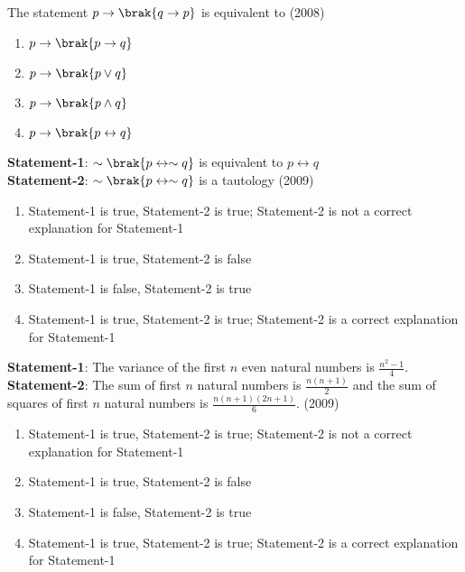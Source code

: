     \item The statement $p \to \brak{q \to p}$ is equivalent to
        \hfill (2008)

        \begin{multicols}{2}
            \begin{enumerate}
                \item $p \to \brak{p \to q}$
                \item $p \to \brak{p \lor q}$
                \item $p \to \brak{p \land q}$
                \item $p \to \brak{p \leftrightarrow q}$
            \end{enumerate}
        \end{multicols}
        
    \item \textbf{Statement-1}: $\sim \brak{p \leftrightarrow \sim q}$ is
        equivalent to $p \leftrightarrow q$ \\
        \textbf{Statement-2}: $\sim \brak{p \leftrightarrow \sim q}$
        is a tautology
        \hfill (2009)
        
        \begin{enumerate}
            \item Statement-1 is true, Statement-2 is true;
                Statement-2 is not a correct explanation for Statement-1
            \item Statement-1 is true, Statement-2 is false
            \item Statement-1 is false, Statement-2 is true
            \item Statement-1 is true, Statement-2 is true;
                Statement-2 is a correct explanation for Statement-1       
        \end{enumerate}

    \item \textbf{Statement-1}: The variance of the first $n$ even
        natural numbers is $\frac {n^2 - 1} {4}$. \\
        \textbf{Statement-2}: The sum of first $n$ natural numbers
        is $\frac {n(n + 1)} {2}$ and the sum of squares of first
        $n$ natural numbers is $\frac {n(n+1)(2n+1)} {6}$.
        \hfill (2009)

        \begin{enumerate}
            \item Statement-1 is true, Statement-2 is true;
                Statement-2 is not a correct explanation for Statement-1
            \item Statement-1 is true, Statement-2 is false
            \item Statement-1 is false, Statement-2 is true
            \item Statement-1 is true, Statement-2 is true;
                Statement-2 is a correct explanation for Statement-1       
        \end{enumerate}

